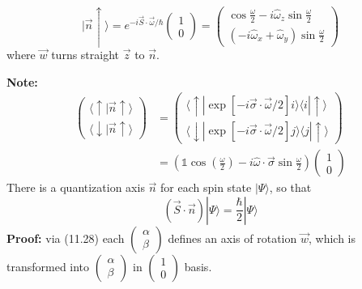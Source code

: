 \begin{equation}
|\vec{n} \uparrow\rangle= e^{-i \vec{S} \cdot \vec{\omega} / \hbar}\left(\begin{array}{c}{1} \\ {0}\end{array}\right)=\left(\begin{array}{c}{\cos \frac{\omega}{2}-i \hat{\omega}_{z} \sin \frac{\omega}{2}} \\ {\left(-i \hat{\omega}_{x}+\hat{\omega}_{y}\right) \sin \frac{\omega}{2}}\end{array}\right)
\end{equation}
where $\vec{w}$ turns straight $\vec{z}$ to $\vec{n}$.\par
\textbf{Note:}
\begin{equation}
\begin{aligned}
\left(\begin{array}{c}
    \langle\uparrow | \vec{n} \uparrow\rangle\\
    \langle\downarrow | \vec{n} \uparrow\rangle
\end{array}\right) &=\left(\begin{array}{c}{\langle\uparrow | \exp [-i \vec{\sigma} \cdot \vec{\omega} / 2] i\rangle\langle i | \uparrow\rangle} \\ {\langle\downarrow | \exp [-i \vec{\sigma} \cdot \vec{\omega} / 2] j\rangle\langle j | \uparrow\rangle}\end{array}\right) \\ &=\left(\mathbb{1} \cos \left(\frac{\omega}{2}\right)-i \hat{\omega} \cdot \vec{\sigma} \sin \frac{\omega}{2}\right)\left(\begin{array}{l}{1} \\ {0}\end{array}\right) 
\end{aligned}
\end{equation}
There is a quantization axis $\vec{n}$ for each spin state $|\Psi\rangle$, so that
\begin{equation}
    (\vec{S} \cdot \vec{n})|\Psi\rangle=\frac{\hbar}{2}|\Psi\rangle
    \end{equation}
\textbf{Proof:} via (11.28) each  $\left(\begin{array}{c}\alpha\\\beta
\end{array}\right)$ defines an axis of rotation $\vec{w}$, which is transformed into $\left(\begin{array}{c}\alpha\\\beta
\end{array}\right)$ in $\left(\begin{array}{c}1\\0
\end{array}\right)$ basis.
